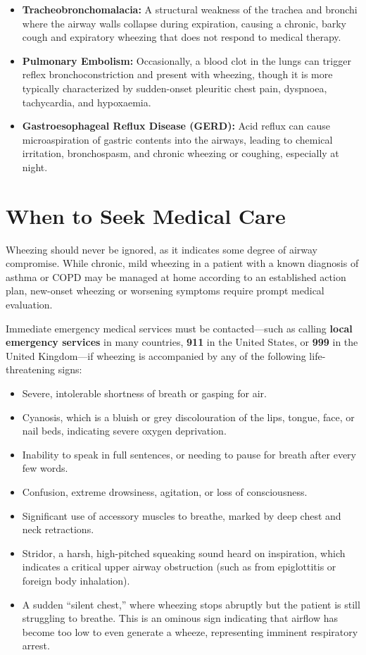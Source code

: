 \begin{itemize}
    \item \textbf{Tracheobronchomalacia:} A structural weakness of the trachea and bronchi where the airway walls collapse during expiration, causing a chronic, barky cough and expiratory wheezing that does not respond to medical therapy.
    \item \textbf{Pulmonary Embolism:} Occasionally, a blood clot in the lungs can trigger reflex bronchoconstriction and present with wheezing, though it is more typically characterized by sudden-onset pleuritic chest pain, dyspnoea, tachycardia, and hypoxaemia.
    \item \textbf{Gastroesophageal Reflux Disease (GERD):} Acid reflux can cause microaspiration of gastric contents into the airways, leading to chemical irritation, bronchospasm, and chronic wheezing or coughing, especially at night.
\end{itemize}

\section*{When to Seek Medical Care}
Wheezing should never be ignored, as it indicates some degree of airway compromise. While chronic, mild wheezing in a patient with a known diagnosis of asthma or COPD may be managed at home according to an established action plan, new-onset wheezing or worsening symptoms require prompt medical evaluation.

Immediate emergency medical services must be contacted---such as calling \textbf{local emergency services} in many countries, \textbf{911} in the United States, or \textbf{999} in the United Kingdom---if wheezing is accompanied by any of the following life-threatening signs:
\begin{itemize}
    \item Severe, intolerable shortness of breath or gasping for air.
    \item Cyanosis, which is a bluish or grey discolouration of the lips, tongue, face, or nail beds, indicating severe oxygen deprivation.
    \item Inability to speak in full sentences, or needing to pause for breath after every few words.
    \item Confusion, extreme drowsiness, agitation, or loss of consciousness.
    \item Significant use of accessory muscles to breathe, marked by deep chest and neck retractions.
    \item Stridor, a harsh, high-pitched squeaking sound heard on inspiration, which indicates a critical upper airway obstruction (such as from epiglottitis or foreign body inhalation).
    \item A sudden ``silent chest,'' where wheezing stops abruptly but the patient is still struggling to breathe. This is an ominous sign indicating that airflow has become too low to even generate a wheeze, representing imminent respiratory arrest.
\end{itemize}

